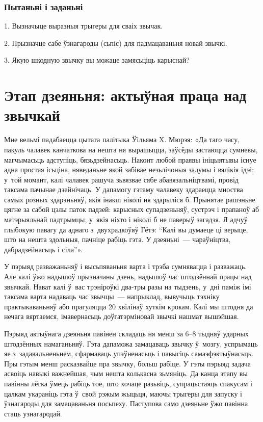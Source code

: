 \subsubsection{Пытаньні і заданьні}

1. Вызначыце выразныя трыгеры для сваіх звычак.

2. Прызначце сабе ўзнагароды (сьпіс) для падмацаваньня новай звычкі.

3. Якую шкодную звычку вы можаце замясьціць карыснай?


\section{Этап дзеяньня: актыўная праца над звычкай}

Мне вельмі падабаецца цытата палітыка Ўільяма X. Мюрэя: «Да таго часу, пакуль чалавек канчаткова на нешта ня вырашыцца, заўсёды застаюцца сумневы, магчымасьць адступіць, бязьдзейнасьць. Наконт любой праявы ініцыятывы існуе адна простая ісьціна, няведаньне якой забівае незьлічоныя задумы і вялікія ідэі: у~той момант, калі чалавек рашуча зьвязвае сябе абавязальніцтвамі, провід таксама пачынае дзейнічаць. У дапамогу гэтаму чалавеку здараецца мноства самых розных здарэньняў, якія інакш ніколі ня здарыліся б. Прынятае рашэньне цягне за сабой цэлы паток падзей: карысных супадзеньняў, сустрэч і прапаноў аб матэрыяльнай падтрымцы, у~якія ніхто і ніколі б не паверыў загадзя. Я адчуў глыбокую павагу да аднаго з~двухрадкоўяў Гётэ: ``Калі вы думаеце ці верыце, што на нешта здольныя, пачніце рабіць гэта. У дзеяньні~--- чараўніцтва, дабрадзейнасьць і сіла''».

У пэрыяд разважаньняў і высьпяваньня варта і трэба сумнявацца і разважаць. Але калі ўжо надышоў прызначаны дзень, надышоў час штодзённай працы над звычкай. Нават калі ў~вас трэніроўкі два-тры разы на тыдзень, у~дні паміж імі таксама варта надаваць час звычцы~--- напрыклад, вывучыць тэхніку практыкаваньняў або прагуляцца 20 хвілінаў хуткім крокам. Калі мы штодня да нечага вяртаемся, імавернасьць доўгатэрміновай звычкі нашмат вышэйшая.

Пэрыяд актыўнага дзеяньня павінен складаць ня менш за 6--8 тыдняў ударных штодзённых намаганьняў. Гэта дапаможа замацаваць звычку ў~мозгу, успрымаць яе з~задавальненьнем, сфармаваць упэўненасьць і павысіць самаэфэктыўнасьць. Пры гэтым менш расказвайце пра звычку, больш рабіце. У гэты пэрыяд задача асвоіць навыкі важнейшая, чым нешта колькасна зьмяніць. Да канца этапу вы павінны лёгка ўмець рабіць тое, што хочаце разьвіць, супрацьстаяць спакусам і цалкам укараніць гэта ў~свой рэжым жыцьця, маючы трыгеры для запуску і ўзнагароды для замацаваньня посьпеху. Паступова само дзеяньне ўжо павінна стаць узнагародай.

